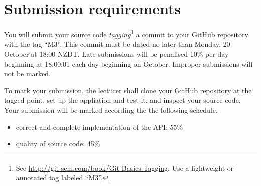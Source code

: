 \documentclass{article}
\begin{document}
\section{Submission requirements}
  You will submit your source code \emph{tagging}\footnote{See \url{http://git-scm.com/book/Git-Basics-Tagging}.  Use a lightweight or annotated tag labeled ``M3''.} a commit to your GitHub repository with the tag ``M3''.  This commit must be dated no later than Monday, 20 October`at 18:00 NZDT. Late submissions will be penalised 10\% per day beginning at 18:00:01 each day beginning on October.  Improper submissions will not be marked.  

To mark your submission, the lecturer shall clone your GitHub repository at the tagged point, set up the appliation and test it, and inspect your source code.  Your submission will be marked according the the following schedule.

\begin{itemize}
  \item correct and complete implementation of the API:  55\%
  \item quality of source code: 45\%
\end{itemize}
\end{document}
